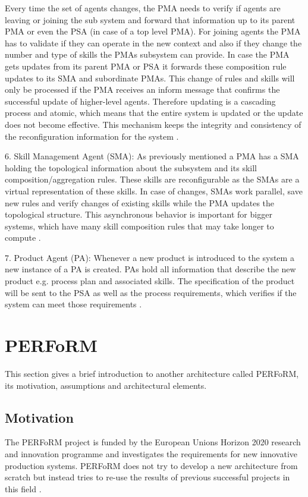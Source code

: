 \documentclass[conference,compsoc,hidelinks]{IEEEtran}
\begin{document}
Every time the set of agents changes, the PMA needs to verify if agents are leaving or joining the sub system and forward that information up to its parent PMA or even the PSA (in case of a top level PMA). For joining agents the PMA has to validate if they can operate in the new context and also if they change the number and type of skills the PMAs subsystem can provide. In case the PMA gets updates from its parent PMA or PSA it forwards these composition rule updates to its SMA and subordinate PMAs. This change of rules and skills will only be processed if the PMA receives an inform message that confirms the successful update of higher-level agents. Therefore updating is a cascading process and atomic, which means that the entire system is updated or the update does not become effective. This mechanism keeps the integrity and consistency of the reconfiguration information for the system \cite{Hybrid}.

6. Skill Management Agent (SMA): As previously mentioned a PMA has a SMA holding the topological information about the subsystem and its skill composition/aggregation rules. These skills are reconfigurable as the SMAs are a virtual representation of these skills. In case of changes, SMAs work parallel, save new rules and verify changes of existing skills while the PMA updates the topological structure. This asynchronous behavior is important for bigger systems, which have many skill composition rules that may take longer to compute \cite{Hybrid}.

7. Product Agent (PA): Whenever a new product is introduced to the system a new instance of a PA is created. PAs hold all information that describe the new product e.g. process plan and associated skills. The specification of the product will be sent to the PSA as well as the process requirements, which verifies if the system can meet those requirements \cite{Hybrid}. 

\section{PERFoRM} \label{sec:PERFoRM} %
This section gives a brief introduction to another architecture called PERFoRM, its motivation, assumptions and architectural elements.

\subsection{Motivation}
The PERFoRM project is funded by the European Unions Horizon 2020 research and innovation programme and investigates the requirements for new innovative production systems. PERFoRM does not try to develop a new architecture from scratch but instead tries to re-use the results of previous successful projects in this field \cite{SpecPERFoRM}. 
\end{document}

